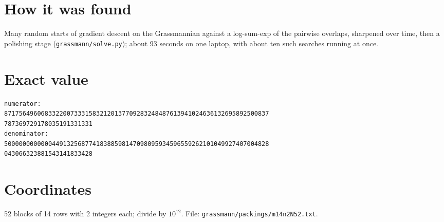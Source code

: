 \documentclass[11pt,a4paper]{article}
\begin{document}
\section{How it was found}
Many random starts of gradient descent on the Grassmannian against a log-sum-exp of the pairwise overlaps, sharpened over time, then a polishing stage (\texttt{grassmann/solve.py}); about 93 seconds on one laptop, with about ten such searches running at once.


\appendix
\section{Exact value}
{\small
\begin{verbatim}
numerator:
871756496068332200733315832120137709283248487613941024636132695892500837
787369729178035191331331
denominator:
500000000000044913256877418388598147098095934596559262101049927407004828
043066323881543141833428
\end{verbatim}}

\section{Coordinates}
52 blocks of 14 rows with 2 integers each; divide by $10^{12}$. File: \texttt{grassmann/packings/m14n2N52.txt}.
{\tiny
\begin{multicols}{4}
\end{multicols}}
\end{document}
